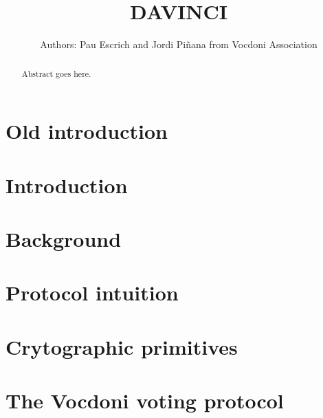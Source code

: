 \documentclass[runningheads, draft]{llncs}
\title{\textsc{DAVINCI}\vspace{-0.4cm}}
\author{Authors: Pau Escrich and Jordi Piñana from Vocdoni Association}
\institute{Last update: \today}
\begin{document}
	
\maketitle

\pagestyle{plain}
\thispagestyle{plain}

\begin{abstract}
		Abstract goes here.
\end{abstract}


\setcounter{tocdepth}{3}
\makeatletter
\renewcommand*\l@author[2]{}
\renewcommand*\l@title[2]{}
\makeatletter
\tableofcontents

{}
\section*{Old introduction}
\label{sec:intro-old}


\section{Introduction}
\label{sec:intro}


\section{Background}
\label{sec:background}


\section{Protocol intuition}
\label{sec:protocol-intuition}


\section{Crytographic primitives} %
\label{sec:cryptographic-primitives}


\section{The Vocdoni voting protocol}
\label{sec:vocdoni-protocol}

\end{document}
